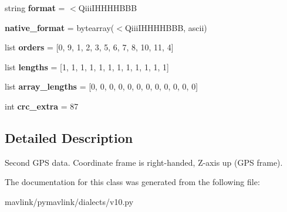 \begin{DoxyCompactItemize}
\item 
\mbox{\label{classpymavlink_1_1dialects_1_1v10_1_1MAVLink__gps2__raw__message_a63d3888879ba14ce626c79a5b20c53f3}} 
string {\bfseries format} = \textquotesingle{}$<$Qiii\+I\+H\+H\+H\+H\+B\+BB\textquotesingle{}
\item 
\mbox{\label{classpymavlink_1_1dialects_1_1v10_1_1MAVLink__gps2__raw__message_a3e07c062fba1128b0fe6b62ceecd9773}} 
{\bfseries native\+\_\+format} = bytearray(\textquotesingle{}$<$Qiii\+I\+H\+H\+H\+H\+B\+BB\textquotesingle{}, \textquotesingle{}ascii\textquotesingle{})
\item 
\mbox{\label{classpymavlink_1_1dialects_1_1v10_1_1MAVLink__gps2__raw__message_a454bcb8f8b674389536b4f62ff2abae8}} 
list {\bfseries orders} = \mbox{[}0, 9, 1, 2, 3, 5, 6, 7, 8, 10, 11, 4\mbox{]}
\item 
\mbox{\label{classpymavlink_1_1dialects_1_1v10_1_1MAVLink__gps2__raw__message_ae0ab7c9877e5857519928bcbb4982aa0}} 
list {\bfseries lengths} = \mbox{[}1, 1, 1, 1, 1, 1, 1, 1, 1, 1, 1, 1\mbox{]}
\item 
\mbox{\label{classpymavlink_1_1dialects_1_1v10_1_1MAVLink__gps2__raw__message_a749acd53dad4a600970d90dec2758b31}} 
list {\bfseries array\+\_\+lengths} = \mbox{[}0, 0, 0, 0, 0, 0, 0, 0, 0, 0, 0, 0\mbox{]}
\item 
\mbox{\label{classpymavlink_1_1dialects_1_1v10_1_1MAVLink__gps2__raw__message_a2d6e9c70873b2f000712279ad4159ba2}} 
int {\bfseries crc\+\_\+extra} = 87
\end{DoxyCompactItemize}


\subsection{Detailed Description}
\begin{DoxyVerb}Second GPS data. Coordinate frame is right-handed, Z-axis up
(GPS frame).
\end{DoxyVerb}
 

The documentation for this class was generated from the following file\+:\begin{DoxyCompactItemize}
\item 
mavlink/pymavlink/dialects/v10.\+py\end{DoxyCompactItemize}
